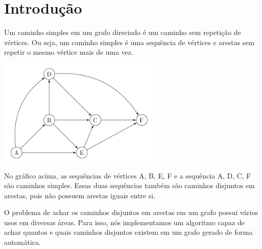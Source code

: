 \section{\esp Introdução}
Um caminho simples em um grafo direciado é um caminho sem repetição de vértices. Ou seja, um caminho simples é uma sequência de vértices e arestas sem repetir o mesmo vértice mais de uma vez.

\begin{center}
    
\includegraphics{figuras/grafodirecionado.png}

\end{center}

No gráfico acima, as sequências de vértices A, B, E, F e a sequência A, D, C, F são caminhos simples. Essas duas sequências também são caminhos disjuntos em arestas, pois não possuem arestas iguais entre si.

O problema de achar os caminhos disjuntos em arestas em um grafo possui vários usos em diversas áreas. Para isso, nós implementamos um algoritmo capaz de achar quantos e quais caminhos disjuntos existem em um grafo gerado de forma automática.

